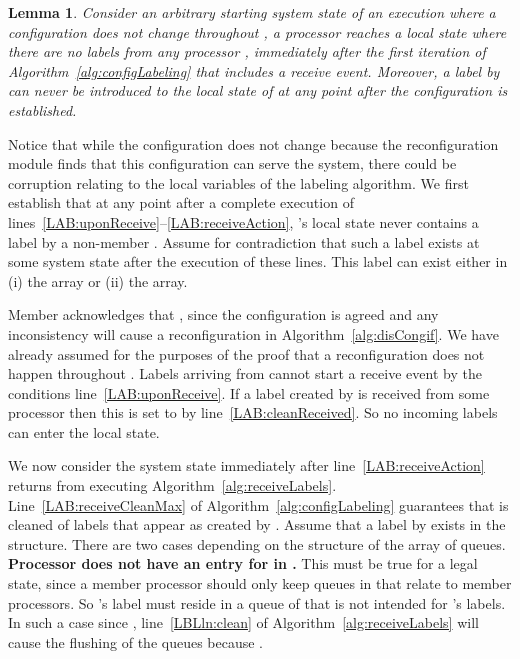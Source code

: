 \documentclass[11pt]{article}
\newtheorem{lemma}[theorem]{Lemma}
\newenvironment{proof}{\noindent{\bf Proof.}}{\hfill}
\begin{document}
\begin{lemma}
\label{thL:staleInfo}
Consider an arbitrary starting system state of an execution  where a configuration does not change throughout , a processor  reaches a local state where there are no labels from any processor , immediately after the first iteration of Algorithm~\ref{alg:configLabeling} that includes a receive event. 
Moreover, a label by  can never be introduced to the local state of  at any point after the configuration is established.
\end{lemma}

\begin{proof}
Notice that while the configuration does not change because the reconfiguration module finds that this configuration can serve the system, there could be corruption relating to the local variables of the labeling algorithm.
We first establish that at any point after a complete execution of lines~\ref{LAB:uponReceive}--\ref{LAB:receiveAction}, 's local state never contains a label by a non-member .
Assume for contradiction that such a label exists at some system state after the execution of these lines.
This label can exist either in (i) the  array or (ii) the  array.

Member  acknowledges that , since the configuration is agreed and any inconsistency will cause a reconfiguration in Algorithm~\ref{alg:disCongif}. 
We have already assumed for the purposes of the proof that a reconfiguration does not happen throughout .
Labels arriving from  cannot start a receive event by the conditions line~\ref{LAB:uponReceive}. 
If a label created by  is received from some processor  then this is set to  by line~\ref{LAB:cleanReceived}. 
So no incoming labels can enter the local state.

We now consider the system state immediately after line~\ref{LAB:receiveAction} returns from executing Algorithm~\ref{alg:receiveLabels}.
Line~\ref{LAB:receiveCleanMax} of Algorithm~\ref{alg:configLabeling} guarantees that  is cleaned of labels that appear as created by .
Assume that a label by  exists in the  structure.
There are two cases depending on the structure of the  array of queues.\\
 \textbf{Processor  does not have an entry for  in .}
This must be true for a legal state, since a member processor should only keep queues in  that relate to member processors.
So 's label must reside in a queue of  that is not intended for 's labels. 
In such a case since , line~\ref{LBLln:clean} of Algorithm~\ref{alg:receiveLabels} will cause the flushing of the queues because .


\end{proof}
\end{document}
